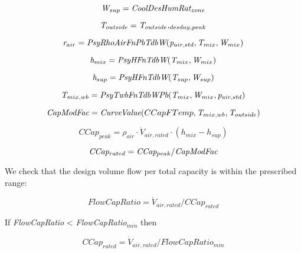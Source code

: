 \begin{equation}
\emph{W\(_{sup}\)} = \emph{CoolDesHumRat\(_{zone}\)}
\end{equation}

\begin{equation}
\emph{T\(_{outside}\)} = \emph{T\(_{outside}\),\(_{desday,peak}\)}
\end{equation}

\begin{equation}
\emph{r\(_{air}\)} = \emph{PsyRhoAirFnPbTdbW}(\emph{p\(_{air,std}\)}, \emph{T\(_{mix}\)},\emph{W\(_{mix}\)})
\end{equation}

\begin{equation}
\emph{h\(_{mix}\)} = \emph{PsyHFnTdbW}(\emph{T\(_{mix}\)},\emph{W\(_{mix}\)})
\end{equation}

\begin{equation}
\emph{h\(_{sup}\)} = \emph{PsyHFnTdbW}(\emph{T\(_{sup}\)},\emph{W\(_{sup}\)})
\end{equation}

\begin{equation}
\emph{T\(_{mix,wb}\)} = \emph{PsyTwbFnTdbWPb}(\emph{T\(_{mix}\)},\emph{W\(_{mix}\)}, \emph{p\(_{air,std}\)})
\end{equation}

\begin{equation}
\emph{CapModFac} = \emph{CurveValue}(CCapFTemp,\emph{T\(_{mix,wb}\)},\emph{T\(_{outside}\)})
\end{equation}

\begin{equation}
CCap_{peak} = \rho_{air} \cdot \dot V_{air,rated} \cdot (h_{mix} - h_{sup})
\end{equation}

\begin{equation}
\emph{CCap\(_{rated}\)} = \emph{CCap\(_{peak}\)}/ \emph{CapModFac}
\end{equation}

We check that the design volume flow per total capacity is within the prescribed range:

\begin{equation}
FlowCapRatio = \dot V_{air,rated} /CCap_{rated}
\end{equation}

If \emph{FlowCapRatio} \textless{} \emph{FlowCapRatio\(_{min}\)} then

\begin{equation}
CCap_{rated} = \dot V_{air,rated}/FlowCapRatio_{min}
\end{equation}

